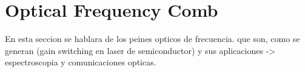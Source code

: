 
\section{Optical Frequency Comb}

	En esta seccion se hablara de los peines opticos de frecuencia. que son, como se generan (gain switching en laser de semiconductor) y sus aplicaciones -> espectroscopia y comunicaciones opticas.
